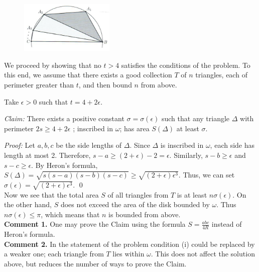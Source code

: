 \documentclass[a4paper, 12pt]{article}
\begin{document}
\begin{enumerate}
\begin{figure}[h]
    \centering
    \includegraphics[width=0.4\textwidth]{2018_G3}
\end{figure}


We proceed by showing that no $t > 4$ satisfies the conditions of the problem.  To this end, we assume that there exists a good collection $T$ of $n$ triangles, each of perimeter greater than $t$, and then bound $n$ from above.

Take $\epsilon > 0$ such that $t  = 4 + 2\epsilon$.

\textit{Claim: } There exists a positive constant $\sigma = \sigma(\epsilon)$ such that any triangle $\Delta$ with perimeter $2s \geq 4 + 2\epsilon$
; inscribed in $\omega$; has area $S(\Delta)$ at least $\sigma$.

\textit{Proof:} Let $a, b, c$ be the side lengths of $\Delta$. Since $\Delta$ is inscribed in $\omega$, each side has length at most 2.  Therefore, $s-a \geq (2 + \epsilon) - 2= \epsilon$.  Similarly, $s-b \geq \epsilon$ and $s - c \geq \epsilon$.  By Heron's formula, $S(\Delta) = \sqrt{s(s-a)(s-b)(s-c)} \geq \sqrt{(2 + \epsilon) \epsilon^3}$. Thus, we can set $\sigma(\epsilon) = \sqrt{(2 + \epsilon) \epsilon^3}$. \qed \\

Now we see that the total area $S$ of all triangles from $T$ is at least $n \sigma(\epsilon)$.  On the other hand, $S$ does not exceed the area of the disk bounded by $\omega$.  Thus $n \sigma(\epsilon) \leq \pi$, which means that $n$ is bounded from above. \\

\textbf{Comment 1.}  One may prove the Claim using the formula $S  = \frac{abc}{4R}$ instead of Heron's formula. \\

\textbf{Comment 2.}  In the statement of the problem condition (i) could be replaced by a weaker one; each triangle from $T$ lies within $\omega$. This does not affect the solution above, but reduces the number of ways to prove the Claim.



\vspace{5mm}


\end{enumerate}
\end{document}
